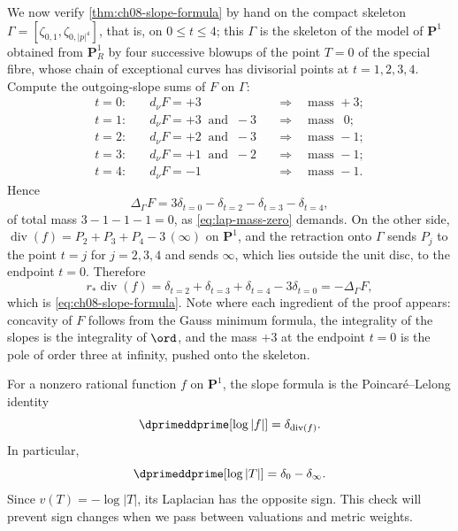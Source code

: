 \begin{example}
We now verify \cref{thm:ch08-slope-formula} by hand on the compact skeleton
$\Gamma=[\zeta_{0,1},\zeta_{0,|p|^4}]$, that is, on $0\leq t\leq4$; this
$\Gamma$ is the skeleton of the model of $\mathbf P^1$ obtained from
$\mathbf P^1_R$ by four successive blowups of the point $T=0$ of the special
fibre, whose chain of exceptional curves has divisorial points at
$t=1,2,3,4$.  Compute the outgoing-slope sums of $F$ on $\Gamma$:
\begin{align*}
 t=0:&\quad d_\nu F=+3
   &&\Longrightarrow\quad \text{mass }+3;\\
 t=1:&\quad d_\nu F=+3\ \text{ and }\ -3
   &&\Longrightarrow\quad \text{mass }\ \ 0;\\
 t=2:&\quad d_\nu F=+2\ \text{ and }\ -3
   &&\Longrightarrow\quad \text{mass }-1;\\
 t=3:&\quad d_\nu F=+1\ \text{ and }\ -2
   &&\Longrightarrow\quad \text{mass }-1;\\
 t=4:&\quad d_\nu F=-1
   &&\Longrightarrow\quad \text{mass }-1 .
\end{align*}
Hence
\[
 \Delta_\Gamma F=3\delta_{t=0}-\delta_{t=2}-\delta_{t=3}-\delta_{t=4},
\]
of total mass $3-1-1-1=0$, as \eqref{eq:lap-mass-zero} demands.  On the other
side, $\operatorname{div}(f)=P_2+P_3+P_4-3\,(\infty)$ on $\mathbf P^1$, and
the retraction onto $\Gamma$ sends $P_j$ to the point $t=j$ for $j=2,3,4$
and sends $\infty$, which lies outside the unit disc, to the endpoint
$t=0$.  Therefore
\[
 r_*\operatorname{div}(f)
 =\delta_{t=2}+\delta_{t=3}+\delta_{t=4}-3\delta_{t=0}
 =-\Delta_\Gamma F ,
\]
which is \eqref{eq:ch08-slope-formula}.  Note where each ingredient of the
proof appears: concavity of $F$ follows from the Gauss minimum formula, the integrality
of the slopes is the integrality of $\ord$, and the mass $+3$ at the endpoint
$t=0$ is the pole of order three at infinity, pushed onto the skeleton.
\end{example}

For a nonzero rational function $f$ on $\mathbf P^1$, the slope formula is
the Poincar\'e--Lelong identity
\begin{equation}
\label{eq:p1-poincare-lelong}
                 \dprimeddprime[\log|f|]=\delta_{\operatorname{div}(f)}.
\end{equation}
In particular,
\[
                 \dprimeddprime[\log|T|]=\delta_0-\delta_\infty.
\]
Since $v(T)=-\log|T|$, its Laplacian has the opposite sign.  This check will
prevent sign changes when we pass between valuations and metric weights.


